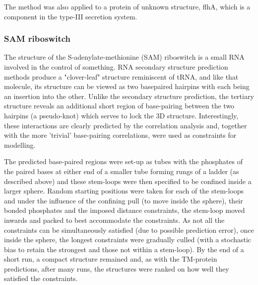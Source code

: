 The method was also applied to a protein of unknown structure, flhA, which is
a component in the type-III secretion system.

\subsubsection{SAM riboswitch}

The structure of the S-adenylate-methionine (SAM) riboswitch is a small RNA involved
in the control of something.   RNA secondary structure prediction methods produce
a "clover-leaf" structure reminiscent of tRNA, and like that molecule, its structure
can be viewed as two basepaired hairpins with each being an insertion into the other.
Unlike the secondary structure prediction, the tertiary structure reveals an additional
short region of base-pairing between the two hairpins (a pseudo-knot) which serves
to lock the 3D structure.   Interestingly, these interactions are clearly predicted
by the correlation analysis and, together with the more 'trivial' base-pairing
correlations, were used as constraints for modelling.

The predicted base-paired regions were set-up as tubes with the phosphates of the paired bases
at either end of a smaller tube forming rungs of a ladder (as described above) and these stem-loops
were then specified to be confined inside a larger sphere.    Random starting positions were taken
for each of the stem-loops and under the influence of the confining pull (to move inside the
sphere), their bonded phosphates and the imposed distance constraints, the stem-loop moved
inwards and packed to best accommodate the constraints.    As not all the constraints can be
simultaneously satisfied (due to possible prediction error), once inside the sphere,
the longest constraints were gradually culled (with a stochastic bias to retain the
strongest and those not within a stem-loop).   By the end of a short run, a compact
structure remained and, as with the TM-protein predictions, after many runs, the structures
were ranked on how well they satisfied the constraints.
